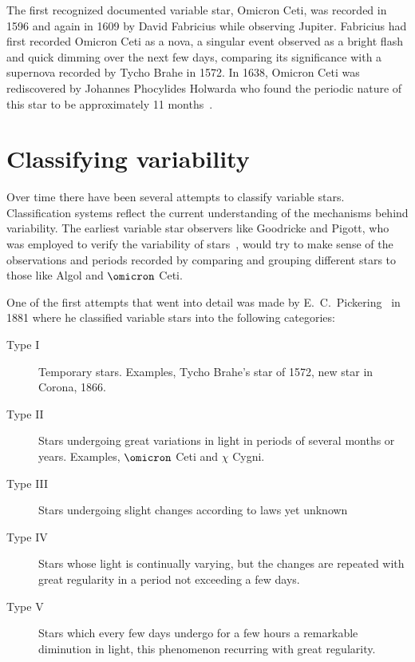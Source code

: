 The first recognized documented variable star, Omicron Ceti,  was recorded in 1596 and again in 1609 by David Fabricius while observing Jupiter.
Fabricius had first recorded Omicron Ceti as a nova, a singular event observed as a bright flash and quick dimming over the next few days,
comparing its significance with a supernova recorded by Tycho Brahe in 1572.
In 1638, Omicron Ceti was rediscovered by Johannes Phocylides Holwarda who found the periodic nature of this star to be approximately 11 months~\cite{hockey_2007}.


\section{Classifying variability}
Over time there have been several attempts to classify variable stars.
Classification systems reflect the current understanding of the mechanisms behind variability.
The earliest variable star observers like Goodricke and Pigott, who was employed to verify the variability of stars~\cite{pigott_1785}, would try to make sense of the observations and periods recorded by comparing and grouping different stars to those like Algol and $\omicron$ Ceti.  

One of the first attempts that went into detail was made by E.\ C.\ Pickering~\cite{sterken_1996, hoffleit_1972} in 1881 where he classified variable stars into the following categories\cite{pickering_1881}:
\begin{description}
    \item [Type I] Temporary stars. Examples, Tycho Brahe's star of 1572, new star in Corona, 1866.
    \item [Type II] Stars undergoing great variations in light in periods of several months or years. Examples, $\omicron$ Ceti and $\chi$ Cygni.
    \item [Type III] Stars undergoing slight changes according to laws yet unknown
    \item [Type IV] Stars whose light is continually varying, but the changes are repeated with great regularity in a period not exceeding a few days. 
    \item [Type V] Stars which every few days undergo for a few hours a remarkable diminution in light, this phenomenon recurring with great regularity. 
\end{description}


